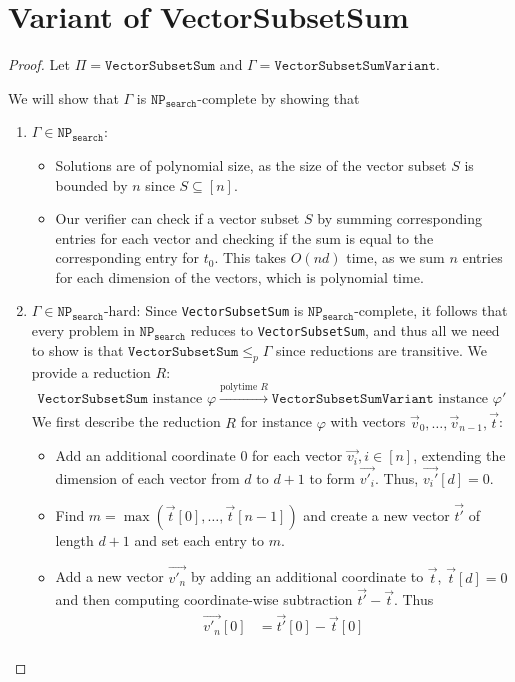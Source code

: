 \documentclass[11pt]{scrartcl}
\theoremstyle{dotlessP}
\theoremstyle{dotlessN}
\newcommand{\np}{\texttt{NP}_\texttt{search}}
\newcommand{\nph}{\texttt{NP}_\texttt{search}\text{-hard}}
\newcommand{\npc}{\texttt{NP}_\texttt{search}\text{-complete}}
\begin{document}
\section{Variant of VectorSubsetSum}
\begin{proof}
	Let $\Pi = \texttt{VectorSubsetSum}$ and  $\Gamma = \texttt{VectorSubsetSumVariant}$.

	We will show that  $\Gamma$ is $\npc$ by showing that
	\begin{enumerate}[1.]
		\item $\Gamma \in \np$: 
			\begin{itemize}
				\item Solutions are of polynomial size, as the size of the vector subset $S$ is bounded by $n$ since  $S \subseteq [n]$.
				\item Our verifier can check if a vector subset $S$ by summing corresponding entries for each vector and checking if the sum is equal to the corresponding entry for $t_0$. This takes $O(nd)$ time, as we sum $n$ entries for each dimension of the vectors, which is polynomial time.
			\end{itemize}
		\item $\Gamma \in \nph$: Since \texttt{VectorSubsetSum} is $\npc$, it follows that every problem in $\np$ reduces to \texttt{VectorSubsetSum}, and thus all we need to show is that $\texttt{VectorSubsetSum} \leq_p \Gamma$ since reductions are transitive. We provide a reduction $R$:
			 \[
				 \texttt{VectorSubsetSum} \text{ instance } \varphi \xrightarrow[]{\text{polytime } R} \texttt{VectorSubsetSumVariant} \text { instance } \varphi'
			\] 
			We first describe the reduction $R$ for instance $\varphi$ with vectors $\vec{v}_0, \dots, \vec{v}_{n-1}, \vec{t}$:
			\begin{itemize}
				\item Add an additional coordinate 0 for each vector $\vec{v_i}, i \in [n]$, extending the dimension of each vector from $d$ to $d+1$ to form $\vec{v'_i}$. Thus, $\vec{v_i'}[d] = 0$.
				\item Find $m = \max({\vec{t}[0], \dots, \vec{t}[n-1]})$ and create a new vector $\vec{t'}$ of length $d+1$ and set each entry to $m$.
				\item Add a new vector $\vec{v'_n}$ by adding an additional coordinate to $\vec{t}$, $\vec{t}[d] = 0$ and then computing coordinate-wise subtraction $\vec{t'} - \vec{t}$. Thus
					\begin{align*}
						\vec{v'_n}[0] &= \vec{t'}[0] - \vec{t}[0] \\

\end{align*}
\end{itemize}
\end{enumerate}
\end{proof}
\end{document}
